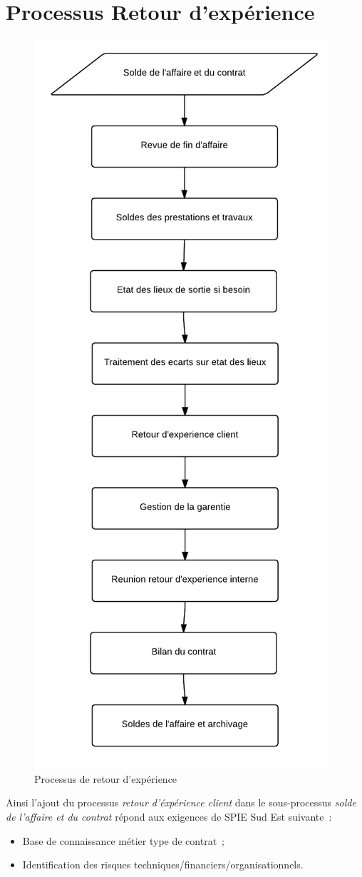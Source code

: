\section{Processus Retour d'expérience}

\begin{figure}[h!]
	\centering
	\includegraphics[width=0.45\linewidth]{images/processus_retour_experience.png}
	\caption{Processus de retour d’expérience}
	\label{fig:processusRetourExperience}
\end{figure}

Ainsi l'ajout du processus \textit{retour d'\'exp\'erience client} dans le sous-processus \textit{solde
de l'affaire et du contrat} r\'epond aux exigences de SPIE Sud Est suivante~:

\begin{itemize}
    \item Base de connaissance m\'etier type de contrat~;
    \item Identification des risques techniques/financiers/organisationnels.
\end{itemize}


